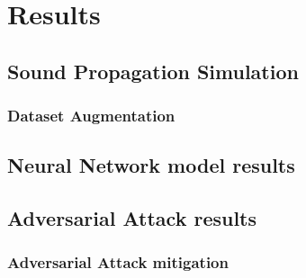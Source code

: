 \chapter{Results}
\label{ch:results}

\section{Sound Propagation Simulation}

\subsection{Dataset Augmentation}

\section{Neural Network model results}

\section{Adversarial Attack results}

\subsection{Adversarial Attack mitigation}